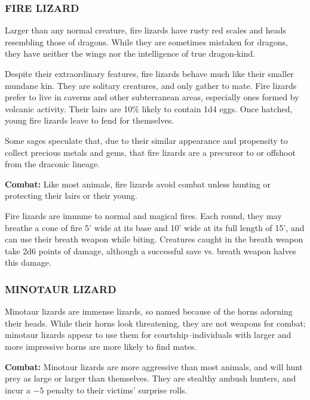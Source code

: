 \begin{multicols}{2}
\begin{minipage}{\columnwidth}
\end{minipage}

\subsubsection{FIRE LIZARD}

Larger than any normal creature, fire lizards have rusty red scales and heads resembling those of dragons. While they are sometimes mistaken for dragons, they have neither the wings nor the intelligence of true dragon-kind. 

Despite their extraordinary features, fire lizards behave much like their smaller mundane kin. They are solitary creatures, and only gather to mate. Fire lizards prefer to live in caverns and other subterranean areas, especially ones formed by volcanic activity. Their lairs are 10\% likely to contain 1d4 eggs. Once hatched, young fire lizards leave to fend for themselves.

Some sages speculate that, due to their similar appearance and propensity to collect precious metals and gems, that fire lizards are a precursor to or offshoot from the draconic lineage.

\textbf{Combat:} Like most animals, fire lizards avoid combat unless hunting or protecting their lairs or their young. 

Fire lizards are immune to normal and magical fires. Each round, they may breathe a cone of fire 5' wide at its base and 10' wide at its full length of 15', and can use their breath weapon while biting. Creatures caught in the breath weapon take 2d6 points of damage, although a successful save vs. breath weapon halves this damage.

\subsubsection{MINOTAUR LIZARD}

Minotaur lizards are immense lizards, so named because of the horns adorning their heads. While their horns look threatening, they are not weapons for combat; minotaur lizards appear to use them for courtship--individuals with larger and more impressive horns are more likely to find mates.

\textbf{Combat:} Minotaur lizards are more aggressive than most animals, and will hunt prey as large or larger than themselves. They are stealthy ambush hunters, and incur a $-5$ penalty to their victims' surprise rolls.


\end{multicols}
